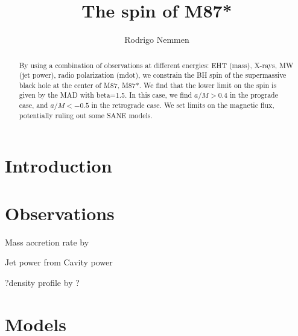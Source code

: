 \documentclass[preprint2]{aastex62}
\begin{document}
\title{The spin of M87*}




\author{Rodrigo Nemmen}

\begin{comment}
\author{Rodrigo Nemmen}
\affil{Universidade de S\~ao Paulo, Instituto de Astronomia, Geof\'{\i}sica e Ci\^encias Atmosf\'ericas, Departamento de Astronomia, S\~ao Paulo, SP 05508-090, Brazil}
\collaboration{(Fermi LAT Collaboration)}
\end{comment}




\begin{abstract}
By using a combination of observations at different energies: EHT (mass), X-rays, MW (jet power), radio polarization (mdot), we constrain the BH spin of the supermassive black hole at the center of M87, M87*. 
We find that the lower limit on the spin is given by the MAD with beta=1.5. In this case, we find $a/M>0.4$ in the prograde case, and $a/M<-0.5$ in the retrograde case. 
We set limits on the magnetic flux, potentially ruling out some SANE models.
\end{abstract}






\section{Introduction} \label{sec:intro}





\section{Observations} \label{sec:obs}

Mass accretion rate by \cite{Kuo2014}

Jet power from Cavity power \cite{Russell2013}

?density profile by \cite{Russell2018}?


\section{Models}
\end{document}
